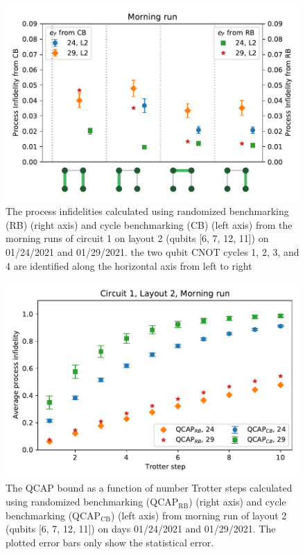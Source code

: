 \begin{figure}[H]
    \includegraphics[scale=0.5]{ProcessInfidelities_CB_RB_Data_01_24_2021_01_292021_Layout2aligned.pdf}
    \caption{The process infidelities calculated using randomized benchmarking (RB) (right axis) and cycle benchmarking (CB) (left axis) from the morning runs of circuit 1 on layout 2 (qubits [6, 7, 12, 11]) on 01/24/2021 and 01/29/2021.  the two qubit CNOT cycles 1, 2, 3, and 4 are identified along the horizontal axis from left to right}
    \label{fig:processinfidelitiesStory4}
\end{figure}
  

\begin{figure}[H]
    \includegraphics[scale=0.56]{QCAP_CB_RB_Data_01_24_29_2021_Layout_2C1.pdf}
    \caption{The QCAP bound as a function of number Trotter steps calculated using randomized benchmarking (QCAP$_{\text{RB}}$) (right axis) and cycle benchmarking (QCAP$_{\text{CB}}$) (left axis) from morning run of layout 2 (qubits [6, 7, 12, 11]) on days 01/24/2021 and 01/29/2021. The plotted error bars only show the statistical error.}
    \label{fig:QCAPCB_RB_Story4}
\end{figure}



